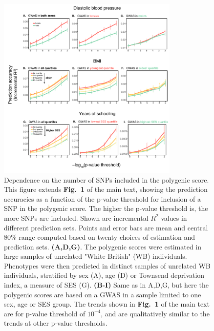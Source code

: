 \documentclass[hidelinks, 12pt]{article}
\begin{document}
\begin{figure}[h]
\centering
\includegraphics[width=0.8\textwidth]{./supp_figures/fig1_Rsweep.pdf}
\caption[Dependence on the number of SNPs included in the polygenic score.]{\small Dependence on the number of SNPs included in the polygenic score. This figure extends {\bf Fig.~1} of the main text, showing the prediction accuracies as a function of the p-value threshold for inclusion of a SNP in the polygenic score. The higher the p-value threshold is, the more SNPs are included. Shown are incremental $R^2$ values in different prediction sets. Points and error bars are mean and central 80\% range computed based on twenty choices of estimation and prediction sets. {\bf (A,D,G)}. The polygenic scores were estimated in large samples of unrelated "White British" (WB) individuals. Phenotypes were then predicted in distinct samples of unrelated WB individuals, stratified by sex (A), age (D) or Townsend deprivation index, a measure of SES (G).  {\bf (B-I)} Same as in A,D,G, but here the polygenic scores are based on a GWAS in a sample limited to one sex, age or SES group. The trends shown in {\bf Fig.~1} of the main text are for p-value threshold of $10^{-4}$, and are qualitatively similar to the trends at other p-value thresholds.}
\centering
\end{figure}

\pagebreak
\end{document}
